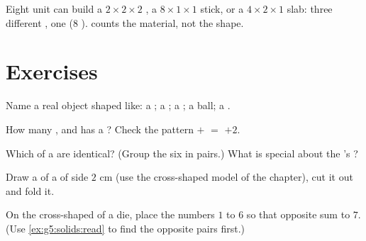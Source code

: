 \begin{example}\label{ex:g5:solids:rearrange}
Eight unit  can build a $2 \times 2 \times 2$ , a
$8 \times 1 \times 1$ stick, or a $4 \times 2 \times 1$ slab: three
different , one  ($8$ ).  counts the
material, not the shape.
\end{example}

\section{Exercises}

\begin{exercise}[$\star$]\label{exo:g5:solids:1}
Name a real object shaped like: a ; a ; a ; a ball;
a .
\end{exercise}

\begin{exercise}[$\star$]\label{exo:g5:solids:2}
How many ,  and  has a ? Check the pattern
 $+$  $=$  $+ 2$.
\end{exercise}

\begin{exercise}[$\star$]\label{exo:g5:solids:3}
Which  of a  are identical? (Group the six  in pairs.)
What is special about the 's ?
\end{exercise}

\begin{exercise}[$\star$]\label{exo:g5:solids:4}
Draw a  of a  of side $2$ cm (use the cross-shaped model of
the chapter), cut it out and fold it.
\end{exercise}

\begin{exercise}[$\star$]\label{exo:g5:solids:5}
On the cross-shaped  of a die, place the numbers $1$ to $6$ so
that opposite  sum to $7$. (Use \cref{ex:g5:solids:read} to
find the opposite pairs first.)
\end{exercise}

